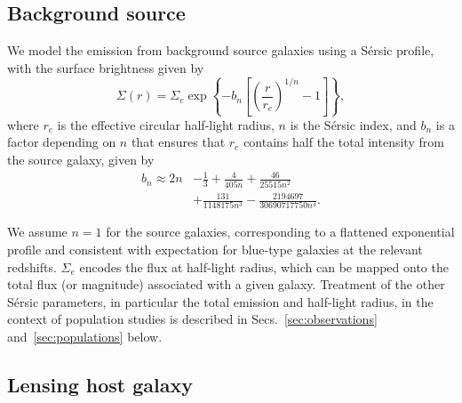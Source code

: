 \documentclass[twocolumn]{aastex62}
\begin{document}
\subsection{Background source}

We model the emission from background source galaxies using a S\'{e}rsic profile, with the surface brightness given by
\begin{equation}
\Sigma(r)=\Sigma_{e} \exp \left\{-b_{n}\left[\left(\frac{r}{r_{e}}\right)^{1 / n}-1\right]\right\},
\end{equation}
where $r_e$ is the effective circular half-light radius, $n$ is the S\'{e}rsic index, and $b_n$ is a factor depending on $n$ that ensures that $r_e$ contains half the total intensity from the source galaxy, given by~\citep{1999A&A...352..447C}
\begin{align}
b_n \approx 2 n &- \frac{1}{3} + \frac{4}{405 n} + \frac{46}{25515 n^2} \nonumber \\ &+ \frac{131}{1148175 n^3} - \frac{2194697}{30690717750 n^4}. \nonumber
\end{align}

We assume $n=1$ for the source galaxies, corresponding to a flattened exponential profile and consistent with expectation for blue-type galaxies at the relevant redshifts. $\Sigma_{e}$ encodes the flux at half-light radius, which can be mapped onto the total flux (or magnitude) associated with a given galaxy. Treatment of the other S\'{e}rsic parameters, in particular the total emission and half-light radius, in the context of population studies is described in Secs.~\ref{sec:observations} and~\ref{sec:populations} below.

\subsection{Lensing host galaxy}
\end{document}
